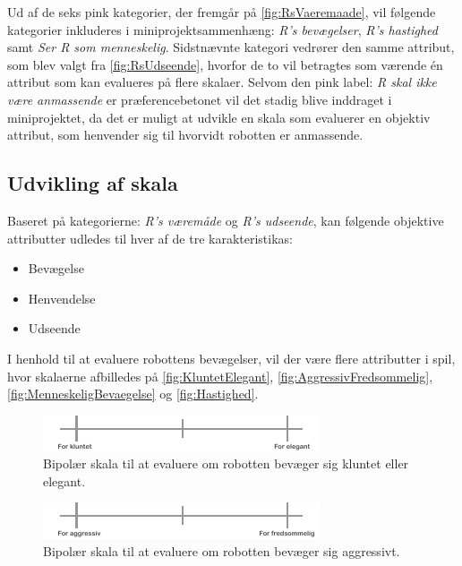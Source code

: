 \noindent
%
Ud af de seks pink kategorier, der fremgår på \autoref{fig:RsVaeremaade}, vil følgende kategorier inkluderes i miniprojektsammenhæng: \textit{R's bevægelser}, \textit{R's hastighed} samt \textit{Ser R som menneskelig}. Sidstnævnte kategori vedrører den samme attribut, som blev valgt fra \autoref{fig:RsUdseende}, hvorfor de to vil betragtes som værende én attribut som kan evalueres på flere skalaer. Selvom den pink label: \textit{R skal ikke være anmassende} er præferencebetonet vil det stadig blive inddraget i miniprojektet, da det er muligt at udvikle en skala som evaluerer en objektiv attribut, som henvender sig til hvorvidt robotten er anmassende.  

\subsection*{Udvikling af skala}
\label{UdviklingSkala}
%
Baseret på kategorierne: \textit{R's væremåde} og \textit{R's udseende}, kan følgende objektive attributter udledes til hver af de tre karakteristikas: \blankline
%
\begin{itemize}
  \item Bevægelse
  \item Henvendelse
  \item Udseende\blankline
\end{itemize}
%
I henhold til at evaluere robottens bevægelser, vil der være flere attributter i spil, hvor skalaerne afbilledes på \autoref{fig:KluntetElegant}, \autoref{fig:AggressivFredsommelig}, \autoref{fig:MenneskeligBevaegelse} og \autoref{fig:Hastighed}.
%
\begin{figure}[H]
\centering
\includegraphics[width =\textwidth]{Figure/KluntetElegant} 
\caption{Bipolær skala til at evaluere om robotten bevæger sig kluntet eller elegant.}
\label{fig:KluntetElegant}
\end{figure}
\noindent
%
%
\begin{figure}[H]
\centering
\includegraphics[width =\textwidth]{Figure/AggressivFredsommelig} 
\caption{Bipolær skala til at evaluere om robotten bevæger sig aggressivt.}
\label{fig:AggressivFredsommelig}
\end{figure}
